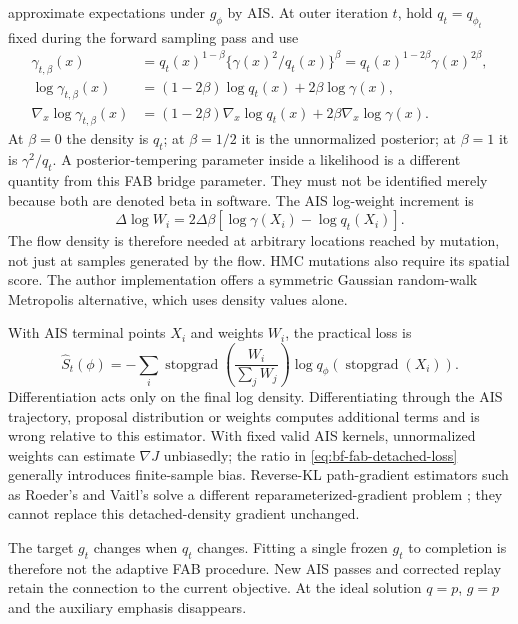 \citet[Section 3.1, Equations 4--7 and Appendix A]{midgley2023fab} approximate
expectations under $g_\phi$ by AIS. At outer iteration $t$, hold $q_t=q_{\phi_t}$
fixed during the forward sampling pass and use
\begin{align}
 \gamma_{t,\beta}(x)
 &=q_t(x)^{1-\beta}\{\gamma(x)^2/q_t(x)\}^{\beta}
 =q_t(x)^{1-2\beta}\gamma(x)^{2\beta},\\
 \log\gamma_{t,\beta}(x)
 &=(1-2\beta)\log q_t(x)+2\beta\log\gamma(x),\\
 \nabla_x\log\gamma_{t,\beta}(x)
 &=(1-2\beta)\nabla_x\log q_t(x)+2\beta\nabla_x\log\gamma(x).
 \label{eq:bf-fab-bridge}
\end{align}
At $\beta=0$ the density is $q_t$; at $\beta=1/2$ it is the unnormalized
posterior; at $\beta=1$ it is $\gamma^2/q_t$. A posterior-tempering parameter
inside a likelihood is a different quantity from this FAB bridge parameter.
They must not be identified merely because both are denoted beta in software.
The AIS log-weight increment is
\begin{equation}
 \Delta\log W_i=2\Delta\beta
 [\log\gamma(X_i)-\log q_t(X_i)].
 \label{eq:bf-fab-weight}
\end{equation}
The flow density is therefore needed at arbitrary locations reached by
mutation, not just at samples generated by the flow. HMC mutations also
require its spatial score. The author implementation offers a symmetric
Gaussian random-walk Metropolis alternative, which uses density values alone.

With AIS terminal points $X_i$ and weights $W_i$, the practical loss is
\begin{equation}
 \widehat S_t(\phi)=-\sum_i
 \operatorname{stopgrad}\!\left(\frac{W_i}{\sum_jW_j}\right)
 \log q_\phi(\operatorname{stopgrad}(X_i)).
 \label{eq:bf-fab-detached-loss}
\end{equation}
Differentiation acts only on the final log density. Differentiating through the
AIS trajectory, proposal distribution or weights computes additional terms
and is wrong relative to this estimator. With fixed valid AIS kernels,
unnormalized weights can estimate $\nabla J$ unbiasedly; the ratio in
\eqref{eq:bf-fab-detached-loss} generally introduces finite-sample bias. Reverse-KL
path-gradient estimators such as Roeder's and Vaitl's solve a different
reparameterized-gradient problem \citep{roeder2017sticking,vaitl2024fastpath};
they cannot replace this detached-density gradient unchanged.

The target $g_t$ changes when $q_t$ changes. Fitting a single frozen $g_t$ to
completion is therefore not the adaptive FAB procedure. New AIS passes and
corrected replay retain the connection to the current objective. At the ideal
solution $q=p$, $g=p$ and the auxiliary emphasis disappears.

